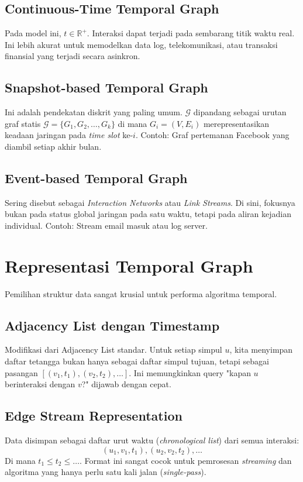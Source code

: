 \documentclass[12pt,a4paper]{book}
\begin{document}
\subsection{Continuous-Time Temporal Graph}
Pada model ini, $t \in \mathbb{R}^{+}$. Interaksi dapat terjadi pada sembarang titik waktu real. Ini lebih akurat untuk memodelkan data log, telekomunikasi, atau transaksi finansial yang terjadi secara asinkron.

\subsection{Snapshot-based Temporal Graph}
Ini adalah pendekatan diskrit yang paling umum. $\mathcal{G}$ dipandang sebagai urutan graf statis $\mathcal{G} = \{G_1, G_2, \dots, G_k\}$ di mana $G_i = (V, E_i)$ merepresentasikan keadaan jaringan pada \textit{time slot} ke-$i$. Contoh: Graf pertemanan Facebook yang diambil setiap akhir bulan.

\subsection{Event-based Temporal Graph}
Sering disebut sebagai \textit{Interaction Networks} atau \textit{Link Streams}. Di sini, fokusnya bukan pada status global jaringan pada satu waktu, tetapi pada aliran kejadian individual. Contoh: Stream email masuk atau log server.

\section{Representasi Temporal Graph}
Pemilihan struktur data sangat krusial untuk performa algoritma temporal.

\subsection{Adjacency List dengan Timestamp}
Modifikasi dari Adjacency List standar. Untuk setiap simpul $u$, kita menyimpan daftar tetangga bukan hanya sebagai daftar simpul tujuan, tetapi sebagai pasangan $[(v_1, t_1), (v_2, t_2), \dots]$. Ini memungkinkan query "kapan $u$ berinteraksi dengan $v$?" dijawab dengan cepat.

\subsection{Edge Stream Representation}
Data disimpan sebagai daftar urut waktu (\textit{chronological list}) dari semua interaksi:
$$ (u_1, v_1, t_1), (u_2, v_2, t_2), \dots $$
Di mana $t_1 \le t_2 \le \dots$. Format ini sangat cocok untuk pemrosesan \textit{streaming} dan algoritma yang hanya perlu satu kali jalan (\textit{single-pass}).
\end{document}
